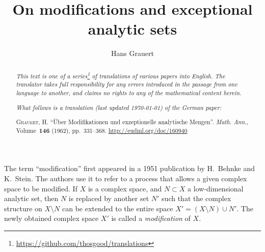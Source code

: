 \documentclass{article}
\theoremstyle{plain}
\theoremstyle{definition}
\begin{document}
\renewcommand{\abstractname}{Translator's note.}

\title{On modifications and exceptional analytic sets}
\author{Hans Grauert}
\date{}
\maketitle

\begin{abstract}
  \renewcommand*{\thefootnote}{\fnsymbol{footnote}}
  \emph{This text is one of a series\footnote{\url{https://github.com/thosgood/translations}} of translations of various papers into English.}
  \emph{The translator takes full responsibility for any errors introduced in the passage from one language to another, and claims no rights to any of the mathematical content herein.}
  
  \emph{What follows is a translation (last updated \today) of the German paper:}

  \medskip\noindent
  \textsc{Grauert, H.}
  ``\"{U}ber Modifikationen und exzeptionelle analytische Mengen''.
  \emph{Math. Ann.}, Volume~\textbf{146} (1962), pp.~331--368.
  {\footnotesize\url{http://eudml.org/doc/160940}}
\end{abstract}

\setcounter{footnote}{0}

\tableofcontents



\bigskip\bigskip
The term ``modification'' first appeared in a 1951 publication \cite{1} by H.~Behnke and K.~Stein.
The authors use it to refer to a process that allows a given complex space to be modified.
If $X$ is a complex space, and $N\subset X$ a low-dimensional analytic set, then $N$ is replaced by another set $N'$ such that the complex structure on $X\setminus N$ can be extended to the entire space $X'=(X\setminus N)\cup N'$.
The newly obtained complex space $X'$ is called a \emph{modification} of $X$.



\nocite{*}

\end{document}
